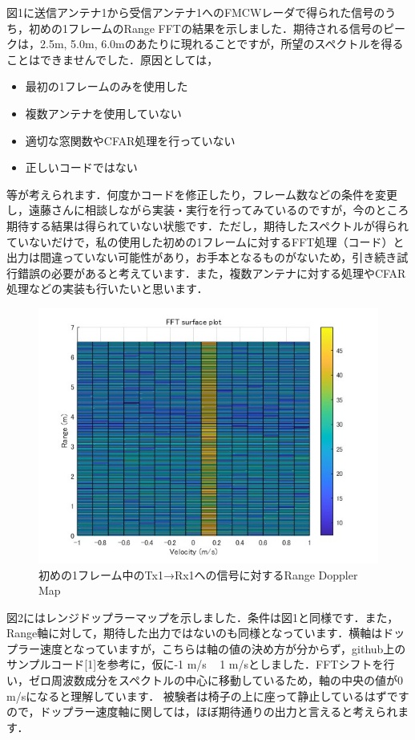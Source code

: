 \documentclass[dvipdfmx]{jsarticle}
\begin{document}
図1に送信アンテナ1から受信アンテナ1へのFMCWレーダで得られた信号のうち，初めの1フレームのRange FFTの結果を示しました．期待される信号のピークは，2.5m, 5.0m, 6.0mのあたりに現れることですが，所望のスペクトルを得ることはできませんでした．原因としては，

\begin{itemize}
    \item 最初の1フレームのみを使用した
    \item 複数アンテナを使用していない
    \item 適切な窓関数やCFAR処理を行っていない
    \item 正しいコードではない
\end{itemize}
等が考えられます．何度かコードを修正したり，フレーム数などの条件を変更し，遠藤さんに相談しながら実装・実行を行ってみているのですが，今のところ期待する結果は得られていない状態です．ただし，期待したスペクトルが得られていないだけで，私の使用した初めの1フレームに対するFFT処理（コード）と出力は間違っていない可能性があり，お手本となるものがないため，引き続き試行錯誤の必要があると考えています．また，複数アンテナに対する処理やCFAR処理などの実装も行いたいと思います．

\begin{figure}[H]
\begin{center}
\includegraphics[width=0.8\linewidth]{./img/RDM_shift_division.jpg}
\end{center}
\caption{初めの1フレーム中のTx1→Rx1への信号に対するRange Doppler Map}
\end{figure}

図2にはレンジドップラーマップを示しました．条件は図1と同様です．また，Range軸に対して，期待した出力ではないのも同様となっています．横軸はドップラー速度となっていますが，こちらは軸の値の決め方が分からず，github上のサンプルコード[1]を参考に，仮に-1 m/s ~ 1 m/sとしました．FFTシフトを行い，ゼロ周波数成分をスペクトルの中心に移動しているため，軸の中央の値が0 m/sになると理解しています．
被験者は椅子の上に座って静止しているはずですので，ドップラー速度軸に関しては，ほぼ期待通りの出力と言えると考えられます．
\end{document}
